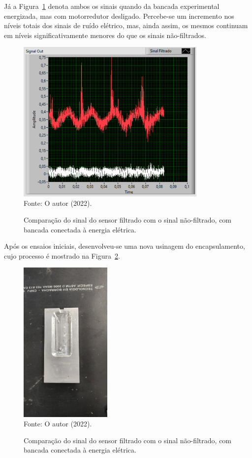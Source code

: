 \documentclass[
	12pt,				
	oneside,			
	a4paper,			
	english,			
	brazil,	
	sumario=abnt-6027-2012		
	]{abntex2ppgsi}
\begin{document}
Já a Figura~\ref{sinal_filtrado_maquina_ligada_tomada} denota ambos os sinais quando da bancada experimental energizada, mas com motorredutor desligado. Percebe-se um incremento nos níveis totais dos sinais de ruído elétrico, mas, ainda assim, os mesmos continuam em níveis significativamente menores do que os sinais não-filtrados.

\begin{figure}[H]
\centering
\caption {Comparação do sinal do sensor filtrado com o sinal não-filtrado, com bancada conectada à energia elétrica.}
\includegraphics[width=\textwidth,height=80mm,keepaspectratio]{GraficosAnalise/sinal_filtrado_maquina_ligada_tomada} \\
Fonte: O autor (2022).
\label{sinal_filtrado_maquina_ligada_tomada}
\end{figure} 

Após os ensaios iniciais, desenvolveu-se uma nova usinagem do encapsulamento, cujo processo é mostrado na Figura~\ref{encapsulamento_novo_usinagem}.

\begin{figure}[H]
\centering
\caption {Comparação do sinal do sensor filtrado com o sinal não-filtrado, com bancada conectada à energia elétrica.}
\includegraphics[width=\textwidth,height=80mm,keepaspectratio]{encapsulamento_novo_usinagem} \\
Fonte: O autor (2022).
\label{encapsulamento_novo_usinagem}
\end{figure} 
\end{document}
